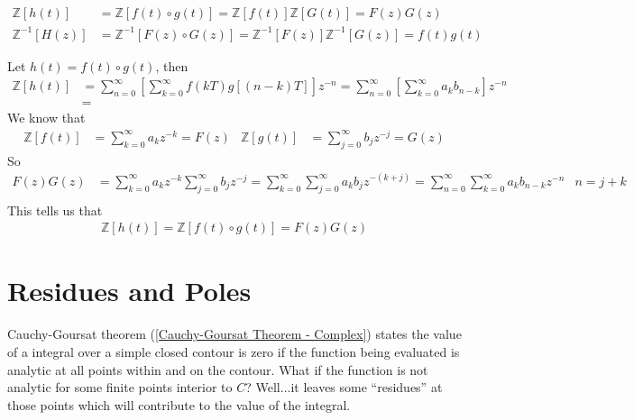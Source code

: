 \documentclass[12pt, english]{book}
\makeatletter
\renewenvironment{proof}[1][\proofname]{\par
	\pushQED{\qed}%
	\normalfont \topsep6\p@\@plus6\p@\relax
	\list{}{%
		\settowidth{\leftmargin}{\itshape\proofname:\hskip\labelsep}%
		\setlength{\labelwidth}{0pt}%
		\setlength{\itemindent}{-\leftmargin}%
	}%
	\item[\hskip\labelsep\itshape#1\@addpunct{:}]\ignorespaces
	}{ \popQED\endlist\@endpefalse}
\makeatother
\begin{document}
	\begin{definition}
		  
		\begin{align*}
			\mathbb{Z}[h(t)] &= \mathbb{Z}[f(t) \circ g(t)] = \mathbb{Z}[f(t)] \mathbb{Z}[G(t)]= F(z) G(z) \\
			\mathbb{Z}^{-1}[H(z)] &= \mathbb{Z}^{-1}[F(z) \circ G(z)] = \mathbb{Z}^{-1}[F(z)] \mathbb{Z}^{-1}[G(z)] = f(t) g(t)
		\end{align*}
	\end{definition}
	\begin{proof}
		Let \(h(t) = f(t) \circ g(t)\), then 
		\begin{align*}
			\mathbb{Z}[h(t)] 
			&= \sum_{n=0}^{\infty} \left[\sum_{k=0}^{\infty} f(kT) g[(n-k)T] \right] z^{-n} 
			 = \sum_{n=0}^{\infty} \left[\sum_{k=0}^{\infty} a_k b_{n-k} \right] z^{-n} \\
			&= 
		\end{align*}
		We know that 
		\begin{align*}
			\mathbb{Z}[f(t)] &= \sum_{k=0}^{\infty} a_k z^{-k} = F(z) & 
			\mathbb{Z}[g(t)] &= \sum_{j=0}^{\infty} b_j z^{-j} = G(z)
		\end{align*}
		So
		\begin{align*}
			F(z)G(z) &= \sum_{k=0}^{\infty} a_k z^{-k} \sum_{j=0}^{\infty} b_j z^{-j}
					  = \sum_{k=0}^{\infty} \sum_{j=0}^{\infty} a_k b_j z^{-(k+j)} 
					  = \sum_{n=0}^{\infty} \sum_{k=0}^{\infty} a_k b_{n-k} z^{-n} & n = j+k \\
		\end{align*}
		This tells us that 
		\begin{align*}
			\mathbb{Z}[h(t)] = \mathbb{Z}[f(t) \circ g(t)] = F(z) G(z)
		\end{align*}
	\end{proof}



	\chapter{Residues and Poles} \label{Residues and Poles Chapter - Complex}
	
	Cauchy-Goursat theorem (\cref{Cauchy-Goursat Theorem - Complex}) states the value of a integral over a simple closed contour is zero if the function being evaluated is analytic at all points within and on the contour. What if the function is not analytic for some finite points interior to \(C\)? Well...it leaves some ``residues'' at those points which will contribute to the value of the integral.
	
\end{document}
